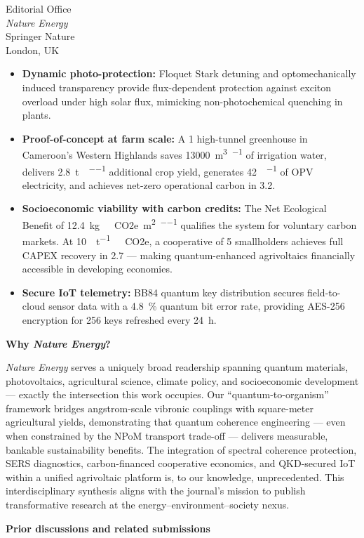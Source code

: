 \documentclass[12pt]{letter}
\begin{document}
\begin{letter}{Editorial Office\\
\textit{Nature Energy}\\
Springer Nature\\
London, UK}
\begin{itemize}
\item \textbf{Dynamic photo-protection:} Floquet Stark detuning and optomechanically induced transparency provide flux-dependent protection against exciton overload under high solar flux, mimicking non-photochemical quenching in plants.

\item \textbf{Proof-of-concept at farm scale:} A \SI{1}{\ha} high-tunnel greenhouse in Cameroon's Western Highlands saves \SI{13000}{\m\cubed\per\yr} of irrigation water, delivers \SI{2.8}{\tonne\per\ha\per\yr} additional crop yield, generates \SI{42}{\MWh\per\yr} of OPV electricity, and achieves net-zero operational carbon in \SI{3.2}{\yr}.

\item \textbf{Socioeconomic viability with carbon credits:} The Net Ecological Benefit of \SI{12.4}{\kg\ CO2e\per\m\squared\per\yr} qualifies the system for voluntary carbon markets. At \SI{10}{\USD\per\tonne\ CO2e}, a cooperative of 5 smallholders achieves full CAPEX recovery in \SI{2.7}{\yr} --- making quantum-enhanced agrivoltaics financially accessible in developing economies.

\item \textbf{Secure IoT telemetry:} BB84 quantum key distribution secures field-to-cloud sensor data with a \SI{4.8}{\percent} quantum bit error rate, providing AES-256 encryption for \SI{256}{\bit} keys refreshed every \SI{24}{\hour}.
\end{itemize}

\noindent\textbf{Why \textit{Nature Energy}?}

\textit{Nature Energy} serves a uniquely broad readership spanning quantum materials, photovoltaics, agricultural science, climate policy, and socioeconomic development --- exactly the intersection this work occupies. Our ``quantum-to-organism'' framework bridges angstrom-scale vibronic couplings with square-meter agricultural yields, demonstrating that quantum coherence engineering --- even when constrained by the NPoM transport trade-off --- delivers measurable, bankable sustainability benefits. The integration of spectral coherence protection, SERS diagnostics, carbon-financed cooperative economics, and QKD-secured IoT within a unified agrivoltaic platform is, to our knowledge, unprecedented. This interdisciplinary synthesis aligns with the journal's mission to publish transformative research at the energy--environment--society nexus.

\noindent\textbf{Prior discussions and related submissions}


\end{letter}
\end{document}
